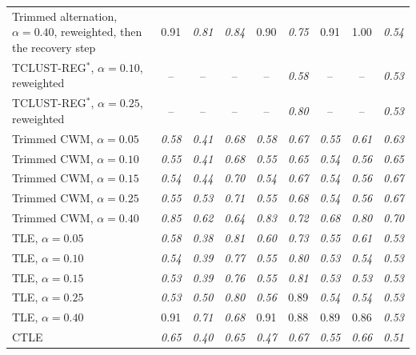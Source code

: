 \begin{table}[htbp]
{\begin{tabular}{lcccccccc}
Trimmed alternation, $\alpha=0.40$, reweighted, then the recovery step & 0.91 & \textit{0.81} & \textit{0.84} & 0.90 & \textit{0.75} & 0.91 & 1.00 & \textit{0.54} \\
TCLUST-REG$^{\ast}$, $\alpha=0.10$, reweighted & -- & -- & -- & -- & \textit{0.58} & -- & -- & \textit{0.53} \\
TCLUST-REG$^{\ast}$, $\alpha=0.25$, reweighted & -- & -- & -- & -- & \textit{0.80} & -- & -- & \textit{0.53} \\
\addlinespace
Trimmed CWM, $\alpha=0.05$ & \textit{0.58} & \textit{0.41} & \textit{0.68} & \textit{0.58} & \textit{0.67} & \textit{0.55} & \textit{0.61} & \textit{0.63} \\
Trimmed CWM, $\alpha=0.10$ & \textit{0.55} & \textit{0.41} & \textit{0.68} & \textit{0.55} & \textit{0.65} & \textit{0.54} & \textit{0.56} & \textit{0.65} \\
Trimmed CWM, $\alpha=0.15$ & \textit{0.54} & \textit{0.44} & \textit{0.70} & \textit{0.54} & \textit{0.67} & \textit{0.54} & \textit{0.56} & \textit{0.67} \\
Trimmed CWM, $\alpha=0.25$ & \textit{0.55} & \textit{0.53} & \textit{0.71} & \textit{0.55} & \textit{0.68} & \textit{0.54} & \textit{0.56} & \textit{0.67} \\
Trimmed CWM, $\alpha=0.40$ & \textit{0.85} & \textit{0.62} & \textit{0.64} & \textit{0.83} & \textit{0.72} & \textit{0.68} & \textit{0.80} & \textit{0.70} \\
\addlinespace
TLE, $\alpha=0.05$ & \textit{0.58} & \textit{0.38} & \textit{0.81} & \textit{0.60} & \textit{0.73} & \textit{0.55} & \textit{0.61} & \textit{0.53} \\
TLE, $\alpha=0.10$ & \textit{0.54} & \textit{0.39} & \textit{0.77} & \textit{0.55} & \textit{0.80} & \textit{0.53} & \textit{0.54} & \textit{0.53} \\
TLE, $\alpha=0.15$ & \textit{0.53} & \textit{0.39} & \textit{0.76} & \textit{0.55} & \textit{0.81} & \textit{0.53} & \textit{0.53} & \textit{0.53} \\
TLE, $\alpha=0.25$ & \textit{0.53} & \textit{0.50} & \textit{0.80} & \textit{0.56} & 0.89 & \textit{0.54} & \textit{0.54} & \textit{0.53} \\
TLE, $\alpha=0.40$ & 0.91 & \textit{0.71} & \textit{0.68} & 0.91 & 0.88 & 0.89 & 0.86 & \textit{0.53} \\
\addlinespace
CTLE & \textit{0.65} & \textit{0.40} & \textit{0.65} & \textit{0.47} & \textit{0.67} & \textit{0.55} & \textit{0.66} & \textit{0.51} \\

\end{tabular}}
\end{table}
